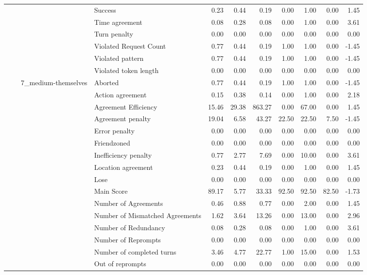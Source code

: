 \begin{tabular}{llllrrrrrrr}
 &  &  & Success & 0.23 & 0.44 & 0.19 & 0.00 & 1.00 & 0.00 & 1.45 \\
 &  &  & Time agreement & 0.08 & 0.28 & 0.08 & 0.00 & 1.00 & 0.00 & 3.61 \\
 &  &  & Turn penalty & 0.00 & 0.00 & 0.00 & 0.00 & 0.00 & 0.00 & 0.00 \\
 &  &  & Violated Request Count & 0.77 & 0.44 & 0.19 & 1.00 & 1.00 & 0.00 & -1.45 \\
 &  &  & Violated pattern & 0.77 & 0.44 & 0.19 & 1.00 & 1.00 & 0.00 & -1.45 \\
 &  &  & Violated token length & 0.00 & 0.00 & 0.00 & 0.00 & 0.00 & 0.00 & 0.00 \\
\cline{3-11}
 &  & \multirow[t]{27}{*}{7_medium-themselves} & Aborted & 0.77 & 0.44 & 0.19 & 1.00 & 1.00 & 0.00 & -1.45 \\
 &  &  & Action agreement & 0.15 & 0.38 & 0.14 & 0.00 & 1.00 & 0.00 & 2.18 \\
 &  &  & Agreement Efficiency & 15.46 & 29.38 & 863.27 & 0.00 & 67.00 & 0.00 & 1.45 \\
 &  &  & Agreement penalty & 19.04 & 6.58 & 43.27 & 22.50 & 22.50 & 7.50 & -1.45 \\
 &  &  & Error penalty & 0.00 & 0.00 & 0.00 & 0.00 & 0.00 & 0.00 & 0.00 \\
 &  &  & Friendzoned & 0.00 & 0.00 & 0.00 & 0.00 & 0.00 & 0.00 & 0.00 \\
 &  &  & Inefficiency penalty & 0.77 & 2.77 & 7.69 & 0.00 & 10.00 & 0.00 & 3.61 \\
 &  &  & Location agreement & 0.23 & 0.44 & 0.19 & 0.00 & 1.00 & 0.00 & 1.45 \\
 &  &  & Lose & 0.00 & 0.00 & 0.00 & 0.00 & 0.00 & 0.00 & 0.00 \\
 &  &  & Main Score & 89.17 & 5.77 & 33.33 & 92.50 & 92.50 & 82.50 & -1.73 \\
 &  &  & Number of Agreements & 0.46 & 0.88 & 0.77 & 0.00 & 2.00 & 0.00 & 1.45 \\
 &  &  & Number of Mismatched Agreements & 1.62 & 3.64 & 13.26 & 0.00 & 13.00 & 0.00 & 2.96 \\
 &  &  & Number of Redundancy & 0.08 & 0.28 & 0.08 & 0.00 & 1.00 & 0.00 & 3.61 \\
 &  &  & Number of Reprompts & 0.00 & 0.00 & 0.00 & 0.00 & 0.00 & 0.00 & 0.00 \\
 &  &  & Number of completed turns & 3.46 & 4.77 & 22.77 & 1.00 & 15.00 & 0.00 & 1.53 \\
 &  &  & Out of reprompts & 0.00 & 0.00 & 0.00 & 0.00 & 0.00 & 0.00 & 0.00 \\

\end{tabular}
